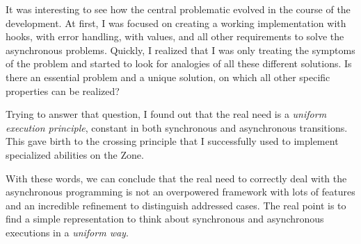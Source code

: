 It was interesting to see how the central problematic evolved in the course of the development. At first, I was focused on creating a working implementation with hooks, with error handling, with values, and all other requirements to solve the asynchronous problems. Quickly, I realized that I was only treating the symptoms of the problem and started to look for analogies of all these different solutions. Is there an essential problem and a unique solution, on which all other specific properties can be realized?

Trying to answer that question, I found out that the real need is a \emph{uniform execution principle}, constant in both synchronous and asynchronous transitions. This gave birth to the crossing principle that I successfully used to implement specialized abilities on the Zone.

With these words, we can conclude that the real need to correctly deal with the asynchronous programming is not an overpowered framework with lots of features and an incredible refinement to distinguish addressed cases. The real point is to find a simple representation to think about synchronous and asynchronous executions in a \emph{uniform way}.
